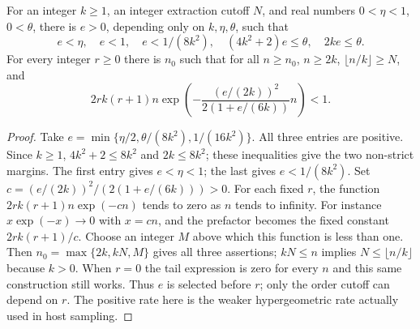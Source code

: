 \begin{lemma}
For an integer $k\geq1$, an integer extraction cutoff $N$, and real
numbers $0<\eta<1$, $0<\theta$, there is $e>0$, depending only on
$k,\eta,\theta$, such that
\[
 e<\eta,\quad e<1,\quad e<1/(8k^2),\quad
 (4k^2+2)e\leq\theta,\quad 2ke\leq\theta.
\]
For every integer $r\geq0$ there is $n_0$ such that for all $n\geq n_0$,
$n\geq2k$, $\lfloor n/k\rfloor\geq N$, and
\[
 2rk(r+1)n\exp\left(-\frac{(e/(2k))^2}{2(1+e/(6k))}n\right)<1.
\]
\end{lemma}
\begin{proof}
Take $e=\min\{\eta/2,\theta/(8k^2),1/(16k^2)\}$.
All three entries are positive. Since $k\geq1$,
$4k^2+2\leq8k^2$ and $2k\leq8k^2$; these inequalities give
the two non-strict margins. The first entry gives $e<\eta<1$;
the last gives $e<1/(8k^2)$.
Set $c=(e/(2k))^2/(2(1+e/(6k)))>0$. For each fixed $r$, the
function $2rk(r+1)n\exp(-cn)$ tends to zero as $n$ tends to infinity.
For instance $x\exp(-x)\to0$ with $x=cn$, and the prefactor
becomes the fixed constant $2rk(r+1)/c$. Choose an integer $M$
above which this function is less than one. Then
$n_0=\max\{2k,kN,M\}$ gives all three assertions; $kN\leq n$
implies $N\leq\lfloor n/k\rfloor$ because $k>0$.
When $r=0$ the tail expression is zero for every $n$ and this
same construction still works. Thus $e$ is selected before $r$;
only the order cutoff can depend on $r$. The positive rate here is
the weaker hypergeometric rate actually used in host sampling.
\end{proof}
